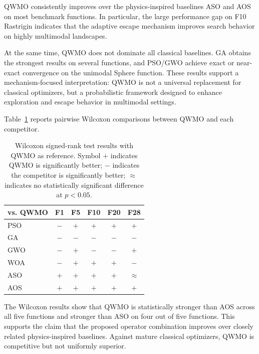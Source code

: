 \documentclass[final,5p,times,twocolumn]{elsarticle}
\begin{document}
QWMO consistently improves over the physics-inspired baselines
ASO and AOS on most benchmark functions. In particular, the
large performance gap on F10 Rastrigin indicates that the
adaptive escape mechanism improves search behavior on highly
multimodal landscapes.

At the same time, QWMO does not dominate all classical
baselines. GA obtains the strongest results on several
functions, and PSO/GWO achieve exact or near-exact convergence
on the unimodal Sphere function. These results support a
mechanism-focused interpretation: QWMO is not a universal
replacement for classical optimizers, but a probabilistic
framework designed to enhance exploration and escape behavior
in multimodal settings.

Table~\ref{tab:wilcoxon} reports pairwise Wilcoxon comparisons
between QWMO and each competitor.

\begin{table}[t]
\centering
\caption{
Wilcoxon signed-rank test results with QWMO as reference.
Symbol $+$ indicates QWMO is significantly better;
$-$ indicates the competitor is significantly better;
$\approx$ indicates no statistically significant difference
at $p<0.05$.
}
\label{tab:wilcoxon}
\renewcommand{\arraystretch}{1.12}
\begin{tabular}{lccccc}
\toprule
\textbf{vs. QWMO}
& \textbf{F1}
& \textbf{F5}
& \textbf{F10}
& \textbf{F20}
& \textbf{F28} \\
\midrule
PSO & $-$ & $+$ & $+$ & $+$ & $+$ \\
GA  & $-$ & $-$ & $-$ & $-$ & $-$ \\
GWO & $-$ & $+$ & $-$ & $-$ & $+$ \\
WOA & $-$ & $+$ & $+$ & $+$ & $-$ \\
ASO & $+$ & $+$ & $+$ & $+$ & $\approx$ \\
AOS & $+$ & $+$ & $+$ & $+$ & $+$ \\
\bottomrule
\end{tabular}
\end{table}

The Wilcoxon results show that QWMO is statistically stronger
than AOS across all five functions and stronger than ASO on
four out of five functions. This supports the claim that the
proposed operator combination improves over closely related
physics-inspired baselines. Against mature classical optimizers,
QWMO is competitive but not uniformly superior.

\end{document}
